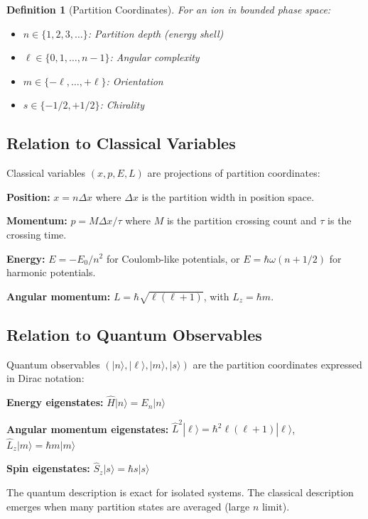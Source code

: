 \documentclass[12pt,a4paper]{article}
\newtheorem{definition}[theorem]{Definition}
\theoremstyle{remark}
\begin{document}
\begin{definition}[Partition Coordinates]
For an ion in bounded phase space:
\begin{itemize}
    \item $n \in \{1, 2, 3, \ldots\}$: Partition depth (energy shell)
    \item $\ell \in \{0, 1, \ldots, n-1\}$: Angular complexity
    \item $m \in \{-\ell, \ldots, +\ell\}$: Orientation
    \item $s \in \{-1/2, +1/2\}$: Chirality
\end{itemize}
\end{definition}

\subsection{Relation to Classical Variables}

Classical variables $(x, p, E, L)$ are projections of partition coordinates:

\textbf{Position:} $x = n \Delta x$ where $\Delta x$ is the partition width in position space.

\textbf{Momentum:} $p = M \Delta x / \tau$ where $M$ is the partition crossing count and $\tau$ is the crossing time.

\textbf{Energy:} $E = -E_0 / n^2$ for Coulomb-like potentials, or $E = \hbar\omega(n + 1/2)$ for harmonic potentials.

\textbf{Angular momentum:} $L = \hbar\sqrt{\ell(\ell+1)}$, with $L_z = \hbar m$.

\subsection{Relation to Quantum Observables}

Quantum observables $(|n\rangle, |\ell\rangle, |m\rangle, |s\rangle)$ are the partition coordinates expressed in Dirac notation:

\textbf{Energy eigenstates:} $\hat{H}|n\rangle = E_n |n\rangle$

\textbf{Angular momentum eigenstates:} $\hat{L}^2|\ell\rangle = \hbar^2 \ell(\ell+1)|\ell\rangle$, $\hat{L}_z|m\rangle = \hbar m|m\rangle$

\textbf{Spin eigenstates:} $\hat{S}_z|s\rangle = \hbar s|s\rangle$

The quantum description is exact for isolated systems. The classical description emerges when many partition states are averaged (large $n$ limit).
\end{document}
